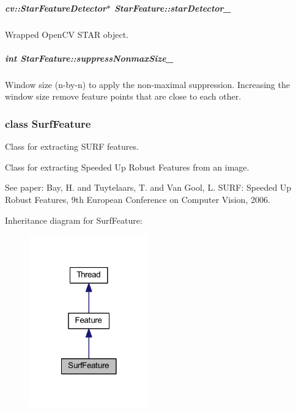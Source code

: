 \hypertarget{group___feature_extractor_ae7fdbb1aee60f2289f5d187025a7d094}{
\subparagraph[{star\-Detector\-\_\-}]{\setlength{\rightskip}{0pt plus 5cm}cv\-::\-Star\-Feature\-Detector$\ast$ Star\-Feature\-::star\-Detector\-\_\-\hspace{0.3cm}{\ttfamily [private]}}}\label{group___feature_extractor_ae7fdbb1aee60f2289f5d187025a7d094}


Wrapped Open\-C\-V S\-T\-A\-R object. 

\hypertarget{group___feature_extractor_a36265d51f6a800441c974579ab4f6801}{
\subparagraph[{suppress\-Nonmax\-Size\-\_\-}]{\setlength{\rightskip}{0pt plus 5cm}int Star\-Feature\-::suppress\-Nonmax\-Size\-\_\-\hspace{0.3cm}{\ttfamily [private]}}}\label{group___feature_extractor_a36265d51f6a800441c974579ab4f6801}


Window size (n-\/by-\/n) to apply the non-\/maximal suppression. Increasing the window size remove feature points that are close to each other. 

\label{class_surf_feature}
\hypertarget{group___feature_extractor_class_surf_feature}{}
\subsubsection{class Surf\-Feature}
Class for extracting S\-U\-R\-F features. 

Class for extracting Speeded Up Robust Features from an image.

See paper\-: Bay, H. and Tuytelaars, T. and Van Gool, L. \-S\-U\-R\-F\-: Speeded Up Robust Features, 9th European Conference on Computer Vision, 2006. 

Inheritance diagram for Surf\-Feature\-:
\nopagebreak
\begin{figure}[H]
\begin{center}
\leavevmode
\includegraphics[width=146pt]{class_surf_feature__inherit__graph}
\end{center}
\end{figure}


